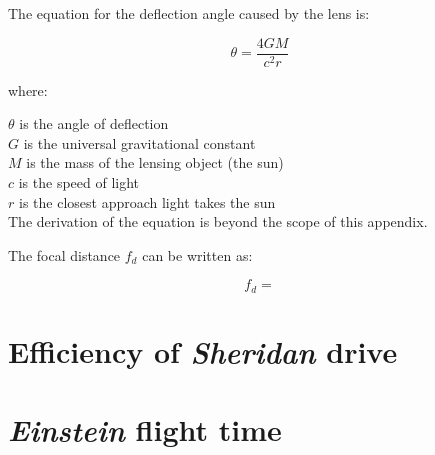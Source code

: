 \documentclass[12pt]{article} %
\begin{document}
The equation for the deflection angle caused by the lens is:

$$\theta = \frac{4GM}{c^2r}$$

where:

$\theta$ is the angle of deflection\\
$G$ is the universal gravitational constant\\
$M$ is the mass of the lensing object (the sun)\\
$c$ is the speed of light\\
$r$ is the closest approach light takes the sun\\

The derivation of the equation is beyond the scope of this appendix.

The focal distance $f_d$ can be written as:

$$f_d = $$

\section{Efficiency of \textit{Sheridan} drive}

\section{\textit{Einstein} flight time}
\end{document}
